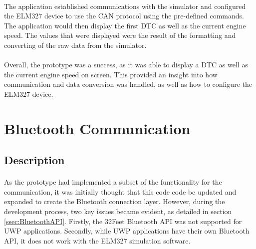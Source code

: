 	\paragraph{}{
	The application established communications with the simulator and configured the ELM327 device to use the CAN protocol using the pre-defined commands. The application would then display the first DTC as well as the current engine speed. The values that were displayed were the result of the formatting and converting of the raw data from the simulator.
	}
	\paragraph{}{	
	Overall, the prototype was a success, as it was able to display a DTC as well as the current engine speed on screen. This provided an insight into how communication and data conversion was handled, as well as how to configure the ELM327 device.
	}

\section{Bluetooth Communication}
	\subsection{Description}
		\paragraph{}{
		As the prototype had implemented a subset of the functionality for the communication, it was initially thought that this code code be updated and expanded to create the Bluetooth connection layer. However, during the development process, two key issues became evident, as detailed in section \ref{ssec:BluetoothAPI}. Firstly, the 32Feet Bluetooth API was not supported for UWP applications. Secondly, while UWP applications have their own Bluetooth API, it does not work with the ELM327 simulation software.
		}
